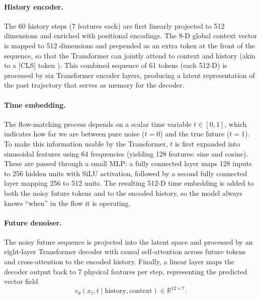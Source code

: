 \documentclass[
  manuscript=proceedings,  %
  layout=preprint,  %
  year=20xx,
  volume=x,
]{extra/joas}
\begin{document}
\paragraph{History encoder.}
The 60 history steps (7 features each) are first linearly projected to 512 dimensions and enriched with positional encodings. The 8-D global context vector is mapped to 512 dimensions and prepended as an extra token at the front of the sequence, so that the Transformer can jointly attend to context and history (akin to a [CLS] token \cite{devlin2019bert}). This combined sequence of 61 tokens (each 512-D) is processed by six Transformer encoder layers, producing a latent representation of the past trajectory that serves as memory for the decoder.

\paragraph{Time embedding.}
The flow-matching process depends on a scalar time variable $t \in [0,1]$, which indicates how far we are between pure noise ($t=0$) and the true future ($t=1$). To make this information usable by the Transformer, $t$ is first expanded into sinusoidal features using 64 frequencies (yielding 128 features: sine and cosine). These are passed through a small MLP: a fully connected layer maps 128 inputs to 256 hidden units with SiLU activation, followed by a second fully connected layer mapping 256 to 512 units. The resulting 512-D time embedding is added to both the noisy future tokens and to the encoded history, so the model always knows “when” in the flow it is operating.

\paragraph{Future denoiser.}
The noisy future sequence is projected into the latent space and processed by an eight-layer Transformer decoder with causal self-attention across future tokens and cross-attention to the encoded history. Finally, a linear layer maps the decoder output back to 7 physical features per step, representing the predicted vector field
\[
v_\theta(x_t, t \mid \text{history}, \text{context}) \in \mathbb{R}^{12 \times 7}.
\]

% 
\end{document}
